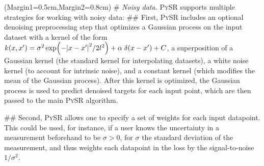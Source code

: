 \documentclass[letterpaper,twocolumn]{scrartcl}
\newcommand\pysr{\textsc{PySR}\xspace}
\begin{document}
\begin{easylist}[itemize]
\ListProperties(Margin1=0.5cm,Margin2=0.8cm)
# \textit{Noisy data.} \pysr supports multiple strategies for working with noisy data:
## First, \pysr includes an optional denoising preprocessing step that optimizes a Gaussian process on the input dataset with a kernel of the form $k(x,x')=\sigma^2\exp(-\abs{x-x'}^2 / 2 l^2) + \alpha\;\delta(x-x') + C$, a superposition of a Gaussian kernel (the standard kernel for interpolating datasets), a white noise kernel (to account for intrinsic noise), and a constant kernel (which modifies the mean of the Gaussian process).
After this kernel is optimized, the Gaussian process is used to predict denoised targets for each input point, which are then passed to the main \pysr algorithm.

## Second, \pysr allows one to specify a set of weights for each input datapoint. This could be used, for instance, if a user knows the uncertainty in a measurement beforehand to be $\sigma>0$, for $\sigma$ the standard deviation of the measurement, and thus weights each datapoint in the loss by the signal-to-noise $1/\sigma^2$.


\end{easylist}
\end{document}
